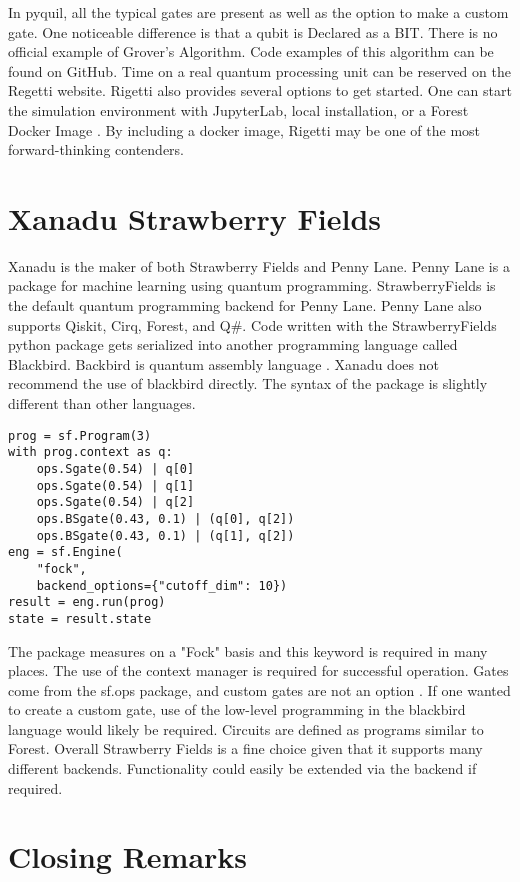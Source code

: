\documentclass[conference]{IEEEtran}
\begin{document}
In pyquil, all the typical gates are present as well as the option to make a custom gate. 
One noticeable difference is that a qubit is Declared as a BIT.
There is no official example of Grover's Algorithm.
Code examples of this algorithm can be found on GitHub. 
Time on a real quantum processing unit can be reserved on the Regetti website. 
Rigetti also provides several options to get started. 
One can start the simulation environment with JupyterLab, local installation, or a Forest Docker Image \cite{b14}. 
By including a docker image, Rigetti may be one of the most forward-thinking contenders.


\section{Xanadu Strawberry Fields}
Xanadu is the maker of both Strawberry Fields and Penny Lane. Penny Lane is a package for machine learning using quantum programming. StrawberryFields is the default quantum programming backend for Penny Lane. Penny Lane also supports Qiskit, Cirq, Forest, and Q\#.
Code written with the StrawberryFields python package gets serialized into another programming language called Blackbird. Backbird is quantum assembly language \cite{b15}. Xanadu does not recommend the use of blackbird directly.
The syntax of the package is slightly different than other languages. 
\begin{verbatim}
prog = sf.Program(3)
with prog.context as q:
    ops.Sgate(0.54) | q[0]
    ops.Sgate(0.54) | q[1]
    ops.Sgate(0.54) | q[2]
    ops.BSgate(0.43, 0.1) | (q[0], q[2])
    ops.BSgate(0.43, 0.1) | (q[1], q[2])
eng = sf.Engine(
    "fock", 
    backend_options={"cutoff_dim": 10})
result = eng.run(prog)
state = result.state
\end{verbatim}
The package measures on a "Fock" basis and this keyword is required in many places. 
The use of the context manager is required for successful operation.
Gates come from the sf.ops package, and custom gates are not an option \cite{b15}.
If one wanted to create a custom gate, use of the low-level programming in the blackbird language would likely be required. 
Circuits are defined as programs similar to Forest.
Overall Strawberry Fields is a fine choice given that it supports many different backends. 
Functionality could easily be extended via the backend if required.



\section{Closing Remarks}
\end{document}
